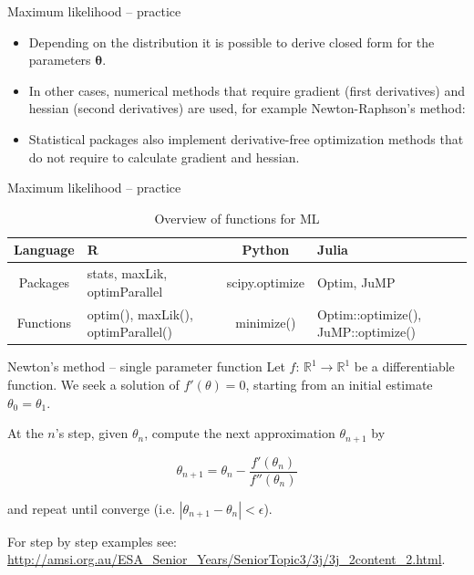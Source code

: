 \documentclass[10pt,ignorenonframetext,aspectratio=169]{beamer}
\begin{document}
\begin{frame}{Maximum likelihood -- practice}
\begin{itemize}
    \item Depending on the distribution it is possible to derive closed form for the parameters $\boldsymbol{\theta}$.
    \item In other cases, numerical methods that require gradient (first derivatives) and hessian (second derivatives) are used, for example Newton-Raphson's method:
    \item Statistical packages also implement derivative-free optimization methods that do not require to calculate gradient and hessian.
\end{itemize}
\end{frame}

\begin{frame}{Maximum likelihood -- practice}
    \begin{table}[]
        \centering
        \caption{Overview of functions for ML}
        \begin{tabular}{cp{3cm}cp{3cm}}
        \hline
          \textbf{Language}   & \textbf{R} &  \textbf{Python} & \textbf{Julia} \\
        \hline
         Packages  & stats, maxLik, optimParallel& scipy.optimize &  Optim, JuMP \\
        Functions & optim(), maxLik(), optimParallel() & minimize() & Optim::optimize(), JuMP::optimize()\\
        \hline
        \end{tabular}
 
    \end{table}
\end{frame}

\begin{frame}{Newton's method -- single parameter function}
    Let $f$: $\mathbb{R}^1 \to \mathbb{R}^1 $ be a differentiable function. We seek a solution of $f'(\theta)=0$, starting from an initial estimate $\theta_0=\theta_1$. 
    
    \vspace{0.5cm}
    
    At the $n$'s step, given $\theta_n$,  compute the next approximation $\theta_{n+1}$ by
    
    \begin{equation}
        \theta_{n+1} = \theta_{n} - \frac{f'(\theta_n)}{f''(\theta_n)}
    \end{equation} 
    
    and repeat until converge (i.e. $|\theta_{n+1}-\theta_n| < \epsilon$).
    
    \vspace{0.5cm}
    
    For step by step examples see: \url{http://amsi.org.au/ESA_Senior_Years/SeniorTopic3/3j/3j_2content_2.html}.
\end{frame}
\end{document}
